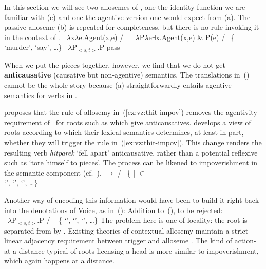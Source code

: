 In this section we will see two allosemes of {\vz}, one the identity function we are familiar with (\nextx c) and one the agentive version one would expect from {\va} (\nextx a). The passive alloseme (\nextx b) is repeated for completeness, but there is no rule invoking it in the context of {\va}.
\pex \label{ex:vz-denote}
	\a \denote{\vz} \lra~$\lambda$x$\lambda$e.Agent(x,e) / \trace~\va
	\a \denote{\vz} \lra~$\lambda$P$\lambda$e$\exists$x.Agent(x,e) \& P(e) / \trace~\{ `murder',  `say’, \dots\}
	\a \denote{\vz} \lra~$\lambda$P$_{<s,t>}$.P
	pass
\xe

When we put the pieces together, however, we find that we do not get \textbf{anticausative} (causative but non-agentive) semantics. The translations in~(\nextx) cannot be the whole story because (\lastx a) straightforwardly entails agentive semantics for verbs in {\thit}.

\cite{kastner17gjgl} proposes that the rule of allosemy in~(\ref{ex:vz:thit-impov}) removes the agentivity requirement of {\va}~for roots such as  which give anticausatives. \cite{kastner16phd,kastner17gjgl} develops a view of roots according to which their lexical semantics determines, at least in part, whether they will trigger the rule in~(\ref{ex:vz:thit-impov}). This change renders the resulting verb \emph{hitparek} `fell apart' anticausative, rather than a potential reflexive such as `tore himself to pieces'. The process can be likened to impoverishment \citep{bonet91,noyer98} in the semantic component (cf.~\citealt{nevins15roots}).
\ex\label{ex:vz:thit-impov}\denote{\va~\!} $\rightarrow$ {\zero} / {\vz} \trace~\{ | 
  $\in$ 
 \\ \phantom{a} \hfill 
	 `',  `',  `', \dots\}
\xe

Another way of encoding this information would have been to build it right back into the denotations of Voice, as in~(\nextx):
\ex Addition to~(\blastx), to be rejected:\\
	\denote{\vz} \lra~$\lambda$P$_{<s,t>}$.P / \trace~{\va} \{ `',  `',  `', \dots\}
\xe
The problem here is one of locality: the root is separated from {\vz} by {\va}. Existing theories of contextual allosemy maintain a strict linear adjacency requirement between trigger and alloseme \citep{marantz13,kastner16phd}. The kind of action-at-a-distance typical of roots licensing a head is more similar to impoverishment, which again happens at a distance.

